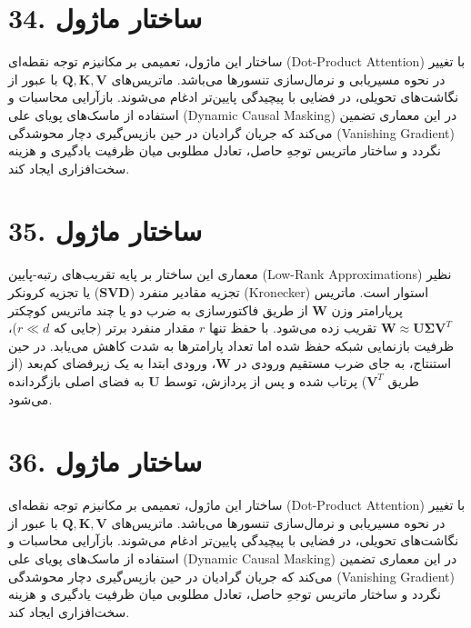 \documentclass[12pt,a4paper]{report}
\begin{document}
\section*{34. ساختار ماژول }
ساختار این ماژول، تعمیمی بر مکانیزم توجه نقطه‌ای (Dot-Product Attention) با تغییر در نحوه مسیریابی و نرمال‌سازی تنسورها می‌باشد. ماتریس‌های $\mathbf{Q, K, V}$ با عبور از نگاشت‌های تحویلی، در فضایی با پیچیدگی پایین‌تر ادغام می‌شوند. بازآرایی محاسبات و استفاده از ماسک‌های پویای علی (Dynamic Causal Masking) در این معماری تضمین می‌کند که جریان گرادیان در حین بازپس‌گیری دچار محوشدگی (Vanishing Gradient) نگردد و ساختار ماتریس توجهِ حاصل، تعادل مطلوبی میان ظرفیت یادگیری و هزینه سخت‌افزاری ایجاد کند.

\section*{35. ساختار ماژول }
معماری این ساختار بر پایه تقریب‌های رتبه-پایین (Low-Rank Approximations) نظیر تجزیه مقادیر منفرد ($\mathbf{SVD}$) یا تجزیه کرونکر (Kronecker) استوار است. ماتریس پرپارامتر وزن $\mathbf{W}$ از طریق فاکتورسازی به ضرب دو یا چند ماتریس کوچکتر $\mathbf{W} \approx \mathbf{U} \mathbf{\Sigma} \mathbf{V}^T$ تقریب زده می‌شود. با حفظ تنها $r$ مقدار منفرد برتر (جایی که $r \ll d$)، ظرفیت بازنمایی شبکه حفظ شده اما تعداد پارامترها به شدت کاهش می‌یابد. در حین استنتاج، به جای ضرب مستقیم ورودی در $\mathbf{W}$، ورودی ابتدا به یک زیرفضای کم‌بعد (از طریق $\mathbf{V}^T$) پرتاب شده و پس از پردازش، توسط $\mathbf{U}$ به فضای اصلی بازگردانده می‌شود.

\section*{36. ساختار ماژول }
ساختار این ماژول، تعمیمی بر مکانیزم توجه نقطه‌ای (Dot-Product Attention) با تغییر در نحوه مسیریابی و نرمال‌سازی تنسورها می‌باشد. ماتریس‌های $\mathbf{Q, K, V}$ با عبور از نگاشت‌های تحویلی، در فضایی با پیچیدگی پایین‌تر ادغام می‌شوند. بازآرایی محاسبات و استفاده از ماسک‌های پویای علی (Dynamic Causal Masking) در این معماری تضمین می‌کند که جریان گرادیان در حین بازپس‌گیری دچار محوشدگی (Vanishing Gradient) نگردد و ساختار ماتریس توجهِ حاصل، تعادل مطلوبی میان ظرفیت یادگیری و هزینه سخت‌افزاری ایجاد کند.
\end{document}
